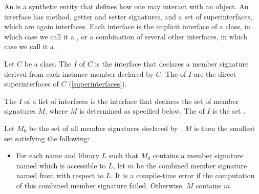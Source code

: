 \documentclass[makeidx]{article}
\begin{document}
\LMHash{}%
An  is a synthetic entity that defines
how one may interact with an object.
An interface has method, getter and setter signatures,
and a set of superinterfaces,
which are again interfaces.
Each interface is the implicit interface of a class,
in which case we call it a
,
or a combination of several other interfaces,
in which case we call it a
.

\LMHash{}%
Let $C$ be a class.
The  $I$ of $C$ is the interface that declares
a member signature derived from
each instance member declared by $C$.
The  of $I$ are the direct superinterfaces of $C$
(\ref{superinterfaces}).


\LMHash{}%
The  $I$ of a list of interfaces 
is the interface that declares the set of member signatures $M$,
where $M$ is determined as specified below.
The  of $I$ is the set .

\LMHash{}%
Let $M_0$ be the set of all member signatures declared by .
$M$ is then the smallest set satisfying the following:

\begin{itemize}
\item For each name \id{} and library $L$ such that $M_0$ contains
  a member signature named \id{} which is accessible to $L$,
  let $m$ be the combined member signature named \id{}
  from  with respect to $L$.
  It is a compile-time error
  if the computation of this combined member signature failed.
  Otherwise, $M$ contains $m$.
\end{itemize}
\end{document}
